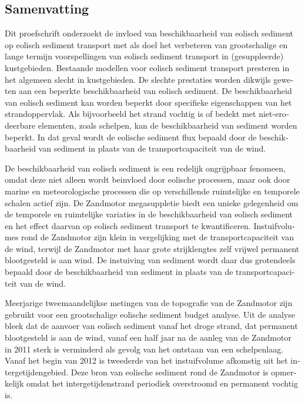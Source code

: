 \begin{otherlanguage}{dutch}
\chapter*{Samenvatting}
Dit proefschrift onderzoekt de invloed van beschikbaarheid van eolisch
sediment op eolisch sediment transport met als doel het verbeteren van
grootschalige en lange termijn voorspellingen van eolisch sediment
transport in (gesuppleerde) kustgebieden. Bestaande modellen voor
eolisch sediment transport presteren in het algemeen slecht in
kustgebieden. De slechte prestaties worden dikwijls geweten aan een
beperkte beschikbaarheid van eolisch sediment. De beschikbaarheid van
eolisch sediment kan worden beperkt door specifieke eigenschappen van
het strandoppervlak. Als bijvoorbeeld het strand vochtig is of bedekt
met niet-erodeerbare elementen, zoals schelpen, kan de beschikbaarheid
van sediment worden beperkt. In dat geval wordt de eolische sediment
flux bepaald door de beschikbaarheid van sediment in plaats van de
transportcapaciteit van de wind.

De beschikbaarheid van eolisch sediment is een redelijk ongrijpbaar
fenomeen, omdat deze niet alleen wordt be{\:i}nvloed door eolische
processen, maar ook door marine en meteorologische processen die op
verschillende ruimtelijke en temporele schalen actief zijn. De
Zandmotor megasuppletie biedt een unieke gelegenheid om de temporele
en ruimtelijke variaties in de beschikbaarheid van eolisch sediment en
het effect daarvan op eolisch sediment transport te
kwantificeren. Instuifvolumes rond de Zandmotor zijn klein in
vergelijking met de transportcapaciteit van de wind, terwijl de
Zandmotor met haar grote strijklengtes zelf vrijwel permanent
blootgesteld is aan wind. De instuiving van sediment wordt daar dus
grotendeels bepaald door de beschikbaarheid van sediment in plaats van
de transportcapaciteit van de wind.

Meerjarige tweemaandelijkse metingen van de topografie van de
Zandmotor zijn gebruikt voor een grootschalige eolische sediment
budget analyse. Uit de analyse bleek dat de aanvoer van eolisch
sediment vanaf het droge strand, dat permanent blootgesteld is aan de
wind, vanaf een half jaar na de aanleg van de Zandmotor in 2011 sterk
is verminderd als gevolg van het ontstaan van een schelpenlaag. Vanaf
het begin van 2012 is tweederde van het instuifvolume afkomstig uit
het intergetijdengebied. Deze bron van eolische sediment rond de
Zandmotor is opmerkelijk omdat het intergetijdenstrand periodiek
overstroomd en permanent vochtig is.


\end{otherlanguage}
